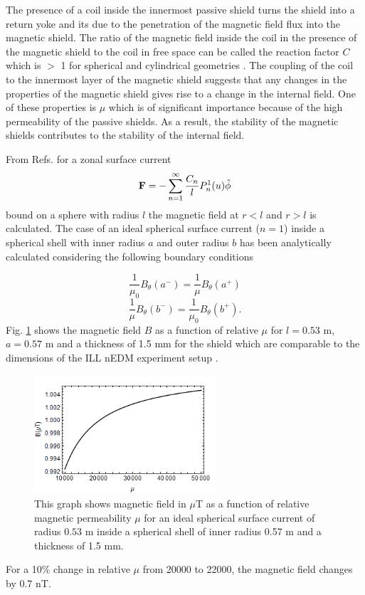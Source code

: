 \documentclass[review]{elsarticle}
\begin{document}
The presence of a coil inside the innermost passive shield turns the shield into a return yoke and its due to the penetration of the magnetic field flux into the magnetic shield. The ratio of the magnetic field inside the coil in the presence of the magnetic shield to the coil in free space can be called the reaction factor $C$ which is $>$ 1 for spherical and cylindrical geometries \cite{bib:bidinosti}. The coupling of the coil to the innermost layer of the magnetic shield suggests that any changes in the properties of the magnetic shield gives rise to a change in the internal field. One of these properties is $\mu$ which is of significant importance because of the high permeability of the passive shields. As a result, the stability of the magnetic shields contributes to the stability of the internal field.

From Refs. \cite{bib:smythe, bib:ferraro} for a zonal surface current
\begin{equation}
\bold{F}=- \sum_{n=1} ^{\infty} \frac{C_n}{l} P^1 _n (u) \hat{\phi}
\end{equation}
bound on a sphere with radius $l$ the magnetic field at $r < l$ and $r>l$ is calculated.
The case of an ideal spherical surface current ($n=1$) inside a spherical shell with inner radius $a$ and outer radius $b$ has been analytically calculated considering the following boundary conditions

\begin{equation}
\frac{1}{\mu_0} B_{\theta} (a^-) = \frac{1}{\mu} B_{\theta}(a^+)
\end{equation}
\begin{equation}
\frac{1}{\mu}B_{\theta}(b^-)=\frac{1}{\mu_0}B_{\theta}(b^+).
\end{equation}
Fig. \ref{fig:Magnetic_Field} shows the magnetic field $B$ as a function of relative $\mu$ for $l=0.53$ m, $a=0.57$ m and a thickness of 1.5 mm for the shield which are comparable to the dimensions of the ILL nEDM experiment setup \cite{bib:baker, bib:knecht}.
\begin{figure}[h!]
\begin{center}
   \includegraphics[width=0.6\textwidth]{B_vs_mu.png}
    \caption{This graph shows magnetic field in $\mu$T as a function of relative magnetic permeability $\mu$ for an ideal spherical surface current of radius $0.53$ m inside a spherical shell of inner radius 0.57 m and a thickness of 1.5 mm.}
    \label{fig:Magnetic_Field}
    \end{center}
\end{figure} 
For a 10\% change in relative $\mu$ from 20000 to 22000, the magnetic field changes by 0.7 nT.
\end{document}
